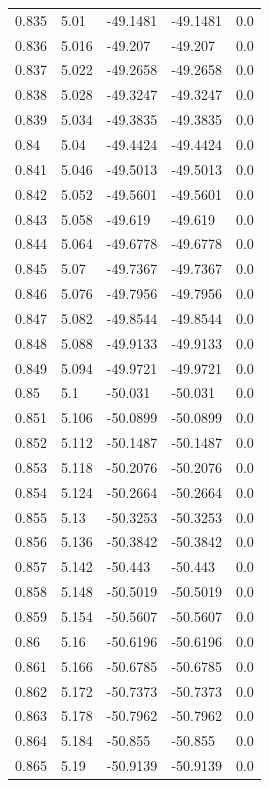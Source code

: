 \begin{table}[H]
\begin{tabular}{lllll}
0.835 & 5.01 & -49.1481 & -49.1481 & 0.0 \\
0.836 & 5.016 & -49.207 & -49.207 & 0.0 \\
0.837 & 5.022 & -49.2658 & -49.2658 & 0.0 \\
0.838 & 5.028 & -49.3247 & -49.3247 & 0.0 \\
0.839 & 5.034 & -49.3835 & -49.3835 & 0.0 \\
0.84 & 5.04 & -49.4424 & -49.4424 & 0.0 \\
0.841 & 5.046 & -49.5013 & -49.5013 & 0.0 \\
0.842 & 5.052 & -49.5601 & -49.5601 & 0.0 \\
0.843 & 5.058 & -49.619 & -49.619 & 0.0 \\
0.844 & 5.064 & -49.6778 & -49.6778 & 0.0 \\
0.845 & 5.07 & -49.7367 & -49.7367 & 0.0 \\
0.846 & 5.076 & -49.7956 & -49.7956 & 0.0 \\
0.847 & 5.082 & -49.8544 & -49.8544 & 0.0 \\
0.848 & 5.088 & -49.9133 & -49.9133 & 0.0 \\
0.849 & 5.094 & -49.9721 & -49.9721 & 0.0 \\
0.85 & 5.1 & -50.031 & -50.031 & 0.0 \\
0.851 & 5.106 & -50.0899 & -50.0899 & 0.0 \\
0.852 & 5.112 & -50.1487 & -50.1487 & 0.0 \\
0.853 & 5.118 & -50.2076 & -50.2076 & 0.0 \\
0.854 & 5.124 & -50.2664 & -50.2664 & 0.0 \\
0.855 & 5.13 & -50.3253 & -50.3253 & 0.0 \\
0.856 & 5.136 & -50.3842 & -50.3842 & 0.0 \\
0.857 & 5.142 & -50.443 & -50.443 & 0.0 \\
0.858 & 5.148 & -50.5019 & -50.5019 & 0.0 \\
0.859 & 5.154 & -50.5607 & -50.5607 & 0.0 \\
0.86 & 5.16 & -50.6196 & -50.6196 & 0.0 \\
0.861 & 5.166 & -50.6785 & -50.6785 & 0.0 \\
0.862 & 5.172 & -50.7373 & -50.7373 & 0.0 \\
0.863 & 5.178 & -50.7962 & -50.7962 & 0.0 \\
0.864 & 5.184 & -50.855 & -50.855 & 0.0 \\
0.865 & 5.19 & -50.9139 & -50.9139 & 0.0 \\

\end{tabular}
\end{table}
